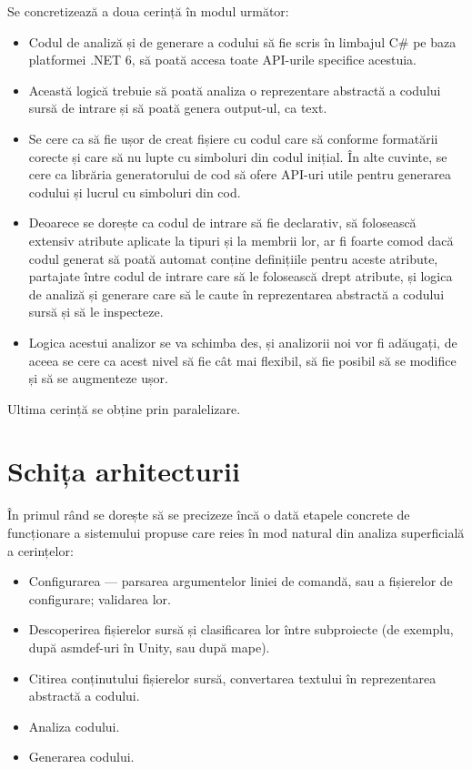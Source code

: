 \documentclass[a4paper,12pt]{report}
\begin{document}
Se concretizează a doua cerință în modul următor:

\begin{itemize}
  \item Codul de analiză și de generare a codului să fie scris în limbajul C\# pe baza platformei {{.}NET} 6, să poată accesa toate \ac{API}-urile specifice acestuia.
  \item Această logică trebuie să poată analiza o reprezentare abstractă a codului sursă de intrare și să poată genera output-ul, ca text.
  \item Se cere ca să fie ușor de creat fișiere cu codul care să conforme formatării corecte și care să nu lupte cu simboluri din codul inițial.
  În alte cuvinte, se cere ca librăria generatorului de cod să ofere \ac{API}-uri utile pentru generarea codului și lucrul cu simboluri din cod.
  \item Deoarece se dorește ca codul de intrare să fie declarativ, să folosească extensiv atribute aplicate la tipuri și la membrii lor, ar fi foarte
  comod dacă codul generat să poată automat conține definițiile pentru aceste atribute, partajate între codul de intrare care să le folosească drept atribute,
  și logica de analiză și generare care să le caute în reprezentarea abstractă a codului sursă și să le inspecteze.
  \item Logica acestui analizor se va schimba des, și analizorii noi vor fi adăugați, de aceea se cere ca acest nivel să fie cât mai flexibil, să fie posibil să se modifice și să se augmenteze ușor.
\end{itemize}


Ultima cerință se obține prin paralelizare.

\section{Schița arhitecturii}

În primul rând se dorește să se precizeze încă o dată etapele concrete de funcționare a sistemului propuse care reies în mod natural din analiza superficială a cerințelor:

\begin{itemize}
\item Configurarea --- parsarea argumentelor liniei de comandă, sau a fișierelor de configurare; validarea lor.
\item Descoperirea fișierelor sursă și clasificarea lor între subproiecte (de exemplu, după asmdef-uri în Unity, sau după mape).
\item Citirea conținutului fișierelor sursă, convertarea textului în reprezentarea abstractă a codului.
\item Analiza codului.
\item Generarea codului.
\end{itemize}
\end{document}
